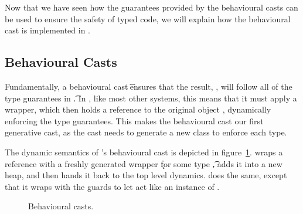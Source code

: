 \documentclass[a4paper,USenglish]{tex/lipics-v2016}
\begin{document}
Now that we have seen how the guarantees provided by the behavioural casts can 
be used to ensure the safety of typed code, we will explain how the 
behavioural cast is implemented in \kafka.


\subsection{Behavioural Casts}

Fundamentally, a behavioural cast \BehCast\t\a ensures that the result, \ap, will
follow all of the type guarantees in \t. In \kafka, like most other systems, 
this means that it must apply a wrapper, which then holds a reference to the
original object \a, dynamically enforcing the type guarantees. This makes the
behavioural cast our first generative cast, as the cast needs to generate a new
class to enforce each type.

The dynamic semantics of \kafka's behavioural cast is depicted in
figure~\ref{behave}.  wraps a reference \a with a freshly generated
wrapper \k for some type \t, adds it into a new heap, and then hands it back to
the top level dynamics.  does the same, except that it wraps \a
with the guards to let \a act like an instance of \any. 

\begin{figure}[!ht]
\hrulefill

\vspace{-2mm}

{  \small
  \begin{mathpar}

\end{mathpar}}  

\vspace{-2mm}
\hrulefill
\caption{Behavioural casts.}\label{behave}
\end{figure}
\end{document}
